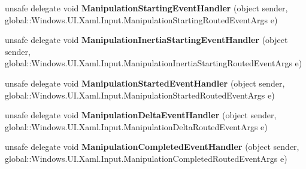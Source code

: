 \begin{DoxyCompactItemize}
\mbox{\label{namespace_windows_1_1_u_i_1_1_xaml_1_1_input_a0bf0f79cc01c2db719a1d440be35a934}} 
unsafe delegate void {\bfseries Manipulation\+Starting\+Event\+Handler} (object sender, global\+::\+Windows.\+U\+I.\+Xaml.\+Input.\+Manipulation\+Starting\+Routed\+Event\+Args e)
\item 
\mbox{\label{namespace_windows_1_1_u_i_1_1_xaml_1_1_input_ac911b874cb50336c1e470f10f32d4147}} 
unsafe delegate void {\bfseries Manipulation\+Inertia\+Starting\+Event\+Handler} (object sender, global\+::\+Windows.\+U\+I.\+Xaml.\+Input.\+Manipulation\+Inertia\+Starting\+Routed\+Event\+Args e)
\item 
\mbox{\label{namespace_windows_1_1_u_i_1_1_xaml_1_1_input_ac0f879dd1b132750d66608defe1c7c15}} 
unsafe delegate void {\bfseries Manipulation\+Started\+Event\+Handler} (object sender, global\+::\+Windows.\+U\+I.\+Xaml.\+Input.\+Manipulation\+Started\+Routed\+Event\+Args e)
\item 
\mbox{\label{namespace_windows_1_1_u_i_1_1_xaml_1_1_input_aac844f180bf0ddd13f1e3529ee397299}} 
unsafe delegate void {\bfseries Manipulation\+Delta\+Event\+Handler} (object sender, global\+::\+Windows.\+U\+I.\+Xaml.\+Input.\+Manipulation\+Delta\+Routed\+Event\+Args e)
\item 
\mbox{\label{namespace_windows_1_1_u_i_1_1_xaml_1_1_input_ae6c7eab926927da4a171ac3ab55edc33}} 
unsafe delegate void {\bfseries Manipulation\+Completed\+Event\+Handler} (object sender, global\+::\+Windows.\+U\+I.\+Xaml.\+Input.\+Manipulation\+Completed\+Routed\+Event\+Args e)
\end{DoxyCompactItemize}
